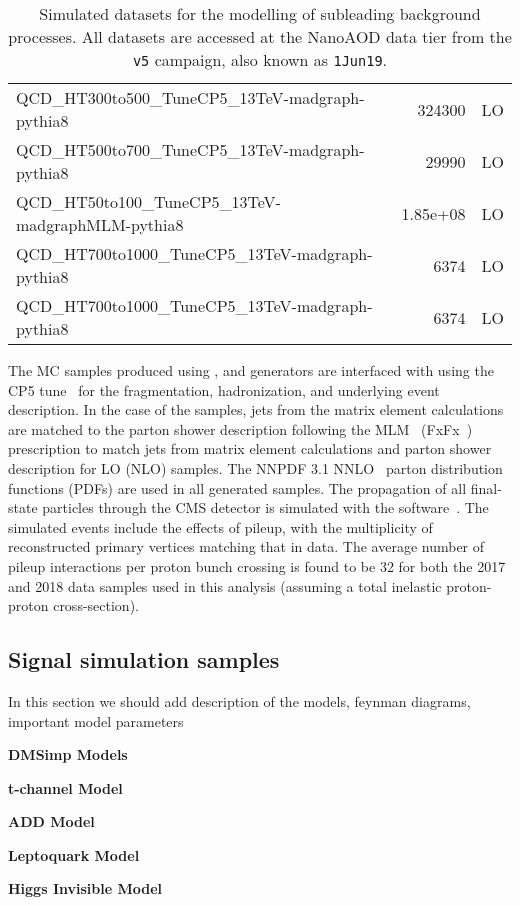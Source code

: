 \begin{table}[ht!]
\begin{tabular}{l|r|c}
QCD\_HT300to500\_TuneCP5\_13TeV-madgraph-pythia8                                  & 324300         & LO  \\
QCD\_HT500to700\_TuneCP5\_13TeV-madgraph-pythia8                                  &  29990         & LO  \\
QCD\_HT50to100\_TuneCP5\_13TeV-madgraphMLM-pythia8                                &      1.85e+08  & LO  \\
QCD\_HT700to1000\_TuneCP5\_13TeV-madgraph-pythia8                                 &   6374         & LO  \\
QCD\_HT700to1000\_TuneCP5\_13TeV-madgraph-pythia8                                 &   6374         & LO  \\

\hline
\hline
\end{tabular}
\caption{Simulated datasets for the modelling of subleading background processes. 
All datasets are accessed at the NanoAOD data tier from the \texttt{v5} campaign, also known as \texttt{1Jun19}.}
\label{tab:BackgroundSamples_2}
\end{table}

The MC samples produced using \MGvATNLO, and \POWHEG
generators are interfaced with \PYTHIA using the CP5 tune~\cite{Sirunyan:2019dfx}
for the fragmentation, hadronization, and underlying event description.
In the case of the \MGvATNLO samples, jets from the matrix element calculations
are matched to the parton shower description following the MLM~\cite{Mangano:2006rw} (FxFx~\cite{Frederix:2012ps})
prescription to match jets from matrix element calculations and parton shower description for LO (NLO) samples.
The NNPDF 3.1 NNLO~\cite{Ball:2017nwa}
parton distribution functions (PDFs) are used in all generated samples.
The propagation of all final-state particles through the CMS detector
is simulated with the  software~\cite{Agostinelli:2002hh}.
The simulated events include the effects of pileup, with the multiplicity of reconstructed primary
vertices matching that in data. The average number of pileup interactions per proton bunch crossing
is found to be 32 for both the 2017 and 2018 data samples used in this analysis (assuming a total inelastic proton-proton cross-section).

\subsection{Signal simulation samples}

{\color{red} In this section we should add description of the models, feynman diagrams, important model parameters}

{\color{red} {\bf DMSimp Models}}

{\color{red} {\bf t-channel Model}}

{\color{red} {\bf ADD Model}}

{\color{red} {\bf Leptoquark Model}}

{\color{red} {\bf Higgs Invisible Model}}
